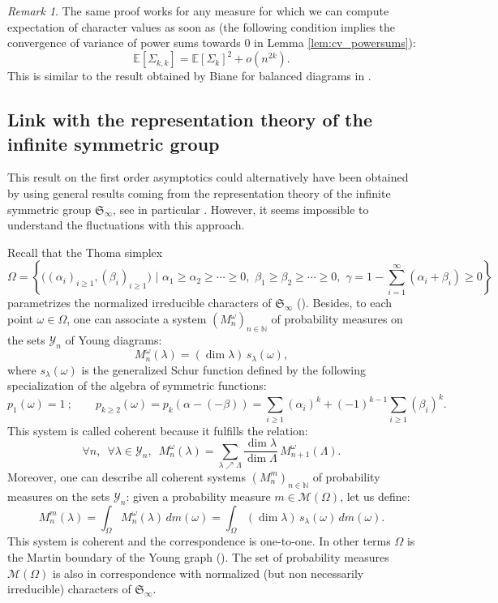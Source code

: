 \documentclass[10pt]{amsart}
\theoremstyle{remark}
\newtheorem{remark}{Remark}
\newcommand{\N}{\mathbb{N}}
\newcommand{\sym}{\mathfrak{S}}
\newcommand{\young}{\mathscr{Y}}
\newcommand{\esper}{\mathbb{E}}
\begin{document}
\begin{remark}
 The same proof works for any measure for which we can compute expectation of character values as soon as (the following condition implies the convergence of variance of power sums towards $0$ in Lemma \ref{lem:cv_powersums}):
$$\esper[\Sigma_{k,k}] = \esper[\Sigma_k]^2 + o(n^{2k}).$$
This is similar to the result obtained by Biane for balanced diagrams in \cite{Bia01}.
\end{remark}
\bigskip



\subsection{Link with the representation theory of the infinite symmetric group}

This result on the first order asymptotics could alternatively have been obtained
by using general results coming from the representation theory of the infinite
symmetric group $\sym_{\infty}$, see in particular \cite{KV81,Ker03,KOV04}.
However, it seems impossible to understand the fluctuations with this approach.

Recall that the Thoma simplex 
$$\Omega=\left\{\big((\alpha_i)_{i \geq 1},(\beta_i)_{i \geq 1}\big) \,\,\big|\,\, \alpha_1\geq \alpha_2\geq \cdots \geq 0,\,\, \beta_1\geq \beta_2\geq \cdots \geq 0,\,\, \gamma=1-\sum_{i=1}^\infty (\alpha_i+\beta_i) \geq 0\right\}$$
parametrizes the normalized irreducible characters of $\sym_{\infty}$ (\cite{Tho64}).
Besides, to each point $\omega \in \Omega$, one can associate a system $(M^{\omega}_{n})_{n\in \N}$
of probability measures on the sets $\young_{n}$ of Young diagrams:
$$M^{\omega}_{n}(\lambda)=(\dim \lambda)\,s_{\lambda}(\omega),$$
 where $s_{\lambda}(\omega)$ is the generalized Schur function defined by the following specialization of the algebra of symmetric functions:
$$p_{1}(\omega)=1\ ;\qquad p_{k\geq 2}(\omega)=p_{k}(\alpha-(-\beta))=\sum_{i\geq 1}(\alpha_{i})^{k}+(-1)^{k-1}\sum_{i \geq 1}(\beta_{i})^{k}.$$
This system is called coherent because it fulfills the relation:
$$\forall n,\,\,\,\forall \lambda \in \young_{n},\,\,\,M^{\omega}_{n}(\lambda)=\sum_{\lambda \nearrow \Lambda} \frac{\dim \lambda}{\dim \Lambda}\,M^{\omega}_{n+1}(\Lambda).$$
Moreover, one can describe all coherent systems $(M^{m}_{n})_{n\in \N}$ of probability measures on the sets $\young_{n}$: given a probability measure $m \in \mathscr{M}(\Omega)$, let us define:
$$M^{m}_{n}(\lambda)=\int_{\Omega}M^{\omega}_{n}(\lambda)\,dm(\omega)=\int_{\Omega}(\dim\lambda)\,s_{\lambda}(\omega)\,dm(\omega).$$
This system is coherent and the correspondence is one-to-one.
In other terms $\Omega$ is the Martin boundary of the Young graph (\cite{KOO97}).
The set of probability measures $\mathscr{M}(\Omega)$ is also in correspondence
with normalized (but non necessarily irreducible) characters of $\sym_{\infty}$.
\end{document}
